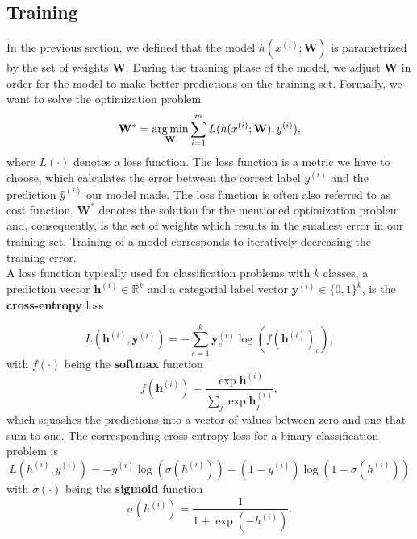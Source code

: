 \subsection{Training}
In the previous section, we defined that the model $h(x^{(i)}; \mathbf{W})$ is parametrized by the set of weights $\textbf{W}$. During the training phase of the model, we adjust $\textbf{W}$ in order for the model to make better predictions on the training set. Formally, we want to solve the optimization problem
\begin{equation}
   \mathbf{W}^{*} = \operatorname*{arg\,min}_\textbf{W} \sum_{i=1}^{m} L(h(x^{(i)}; \mathbf{W}), y^{(i)}),
   \label{eq:optimization}
\end{equation}
where $L(\cdot)$ denotes a loss function. The loss function is a metric we have to choose, which calculates the error between the correct label $y^{(i)}$ and the prediction $\hat{y}^{(i)}$ our model made. The loss function is often also referred to as cost function. $\mathbf{W}^{*}$ denotes the solution for the mentioned optimization problem and, consequently, is the set of weights which results in the smallest error in our training set. Training of a model corresponds to iteratively decreasing the training error.\\
A loss function typically used for classification problems with $k$ classes, a prediction vector $\mathbf{h}^{(i)} \in \mathbb{R}^k$ and a categorial label vector $\mathbf{y}^{(i)} \in \{0,1\}^{k}$, is the \textbf{cross-entropy} loss

\begin{equation}
    L(\mathbf{h}^{(i)}, \mathbf{y}^{(i)}) = -\sum_{c=1}^{k}\mathbf{y}_{c}^{(i)} \log(f(\mathbf{h}^{(i)})_c),
    \label{eq:cross_entropy_multi}
\end{equation}
with $f(\cdot)$ being the \textbf{softmax} function
\begin{equation}
   f(\mathbf{h}^{(i)}) = \frac{\exp\mathbf{h}^{(i)}}{\sum_{j} \exp{\mathbf{h}^{(i)}_{j}}},
   \label{eq:softmax}
\end{equation}
which squashes the predictions into a vector of values between zero and one that sum to one. The corresponding cross-entropy loss for a binary classification problem is
\begin{equation}
    L({h}^{(i)}, {y}^{(i)}) = -{y}^{(i)} \log(\sigma({h}^{(i)})) - (1- {y}^{(i)})\log(1- \sigma({h}^{(i)}))
    \label{eq:cross_entropy_binary}
\end{equation}
with $\sigma(\cdot)$ being the \textbf{sigmoid} function
\begin{equation}
   \sigma({h}^{(i)}) = \frac{1}{1 + \exp{(-{h}^{(i)})}}.
   \label{eq:sigmoid}
\end{equation}


